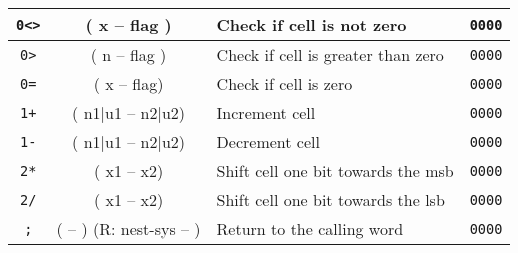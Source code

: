 \begin{center}
\begin{longtable}{|c|c|l|c|}
      \texttt{0<>}                            &
      ( x -- flag )                           &
      Check if cell is not zero               &
      \texttt{0000}                           \\ \hline
                              
      \texttt{0>}                             &
      ( n -- flag )                           &
      Check if cell is greater than zero      &
      \texttt{0000}                           \\ \hline
                              
      \texttt{0=}                             &
      ( x -- flag)                            &
      Check if cell is zero                   &
      \texttt{0000}                           \\ \hline
                              
      \texttt{1+}                             &
      ( n1$\mid$u1 -- n2$\mid$u2)             &
      Increment cell                          &
      \texttt{0000}                           \\ \hline

      \texttt{1-}                             &
      ( n1$\mid$u1 -- n2$\mid$u2)             &
      Decrement cell                          &
      \texttt{0000}                           \\ \hline

      \texttt{2*}                             &
      ( x1 -- x2)                             &
      Shift cell one bit towards the \gls{msb} &
      \texttt{0000}                           \\ \hline

      \texttt{2/}                             &
      ( x1 -- x2)                             &
      Shift cell one bit towards the \gls{lsb} &
      \texttt{0000}                           \\ \hline

      \texttt{;}                              &
      ( -- ) (R: nest-sys -- )                &
      Return to the calling word              &
      \texttt{0000}                           \\ \hline


\end{longtable}
\end{center}
